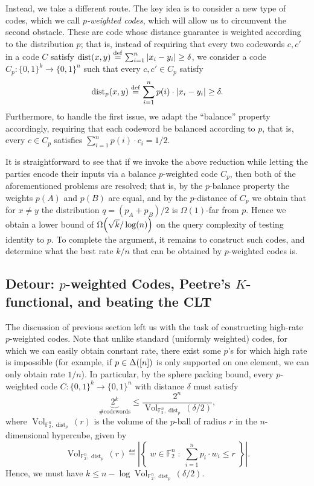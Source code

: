 \documentclass[11pt]{article}
\theoremstyle{remark}   	\newtheorem{remark}[theorem]{Remark}
\theoremstyle{definition}   	\newaliascnt{defn}{theorem}
\newcommand{\bigOmega}[1]{{\Omega\mleft( #1 \mright)}}
\newcommand{\setOfSuchThat}[2]{ \left\{\; #1 \;\colon\; #2\; \right\} } 			\newcommand{\indicSet}[1]{\mathds{1}_{#1}}                                              \newcommand{\indic}[1]{\indicSet{\left\{#1\right\}}}                                             \newcommand{\disjunion}{\amalg}
\newcommand{\distop}{\operatorname{dist}}
\newcommand{\dist}[2]{\distop\mleft({#1, #2}\mright)}
\newcommand{\abs}[1]{\left\lvert #1 \right\rvert}
\newcommand{\bitset}{\ensuremath{\{0,1\}}}
\newcommand{\pdistfunc}[1][p]{\operatorname{dist}_{#1}}
\newcommand{\pdist}[3][p]{\pdistfunc[#1]\mleft({#2, #3}\mright)}
\begin{document}
Instead, we take a different route. The key idea is to consider a new type of codes, which we call \emph{$p$-weighted codes}, which will allow us to circumvent the second obstacle. These are code whose distance guarantee is weighted according to the distribution $p$; that is, instead of requiring that every two codewords $c,c'$ in a code $C$ satisfy $\dist{x}{y} \eqdef \sum_{i=1}^{n} \abs{ x_i - y_i } \geq \delta$, we consider a code $C_p\colon \bitset^k \to \bitset^n$ such that every $c,c' \in C_p$ satisfy
\[
    \pdist[p]{x}{y} \eqdef \sum_{i=1}^{n} p(i)\cdot\abs{ x_i - y_i } \geq \delta.
\]
Furthermore, to handle the first issue, we adapt the ``balance'' property accordingly, requiring that each codeword be balanced according to $p$, that is, every $c \in C_p$ satisfies $\sum_{i=1}^{n} p(i)\cdot c_i = 1/2$.

It is straightforward to see that if we invoke the above reduction while letting the parties encode their inputs via a balance $p$-weighted code $C_p$, then both of the aforementioned problems are resolved; that is, by the $p$-balance property the weights $p(A)$ and $p(B)$ are equal, and by the $p$-distance of $C_p$ we obtain that for $x \neq y$ the distribution $q = (p_A + p_B)/2$ is $\Omega(1)$-far from $p$. Hence we obtain a lower bound of $\bigOmega{ \sqrt{k}/\log(n) }$ on the query complexity of testing identity to $p$. To complete the argument, it remains to construct such codes, and determine what the best rate $k/n$ that can be obtained by $p$-weighted codes is.

\subsection{Detour: $p$-weighted Codes, Peetre's $K$-functional, and beating the CLT}
\label{sec:overview:detour}
The discussion of previous section left us with the task of constructing high-rate $p$-weighted codes. Note that unlike standard (uniformly weighted) codes, for which we can easily obtain constant rate, there exist some $p$'s for which high rate is impossible (for example, if $p\in\Delta\!\left([n]\right)$ is only supported on one element, we can only obtain rate $1/n$). In particular, by the sphere packing bound, every $p$-weighted code $C\colon\bitset^k \to\bitset^n$ with distance $\delta$  must satisfy
\[
      \underbrace{2^k}_{\#\text{codewords}} \leq \frac{2^n}{\operatorname{Vol}_{\mathbb{F}_2^n,\pdistfunc[p]}(\delta/2) },
\]
where $\operatorname{Vol}_{\mathbb{F}_2^n,\pdistfunc[p]}(r)$ is the volume of the $p$-ball of radius $r$ in the $n$-dimensional hypercube, given by
\[
 \operatorname{Vol}_{\mathbb{F}_2^n,\pdistfunc[p]}(r) 
    \eqdef \abs{ \setOfSuchThat{w\in \mathbb{F}_2^n }{\sum_{i=1}^{n} p_i\cdot w_i \leq r } }.
\]
Hence, we must have $k \leq n - \log \operatorname{Vol}_{\mathbb{F}_2^n,\pdistfunc[p]}(\delta/2)$.
\end{document}
